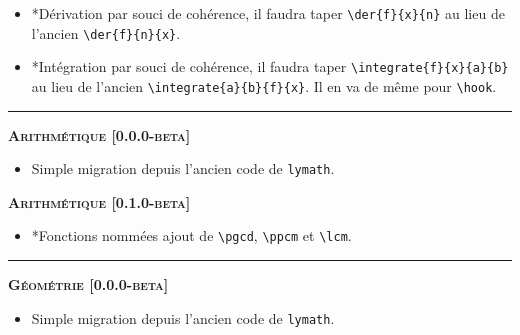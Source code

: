 \documentclass[12pt,a4paper]{book}
\makeatletter
\newcommand\env[1]{\texttt{#1}}
\newcommand\macro[1]{\env{\textbackslash{}#1}}
\theoremstyle{definition}
\newcommand\separation{
	\medskip
	\hfill\rule{0.5\textwidth}{0.75pt}\hfill
	\medskip
}
\newcommand\topic{\@ifstar{\@topic@star}{\@topic@no@star}}
\newcommand\@topic@no@star[1]{%
	\textbf{\textsc{#1}.}%
}
\newcommand\@topic@star[1]{%
	\textbf{\textsc{#1} :}%
}
\makeatother
\begin{document}
{{\begin{description}
\begin{itemize}[itemsep=.5em]
        
    
        \item \topic*{Dérivation}
              par souci de cohérence, il faudra taper \verb#\der{f}{x}{n}# au lieu de l'ancien \verb#\der{f}{n}{x}#.
    
    
        
    
        \item \topic*{Intégration}
              par souci de cohérence, il faudra taper \verb#\integrate{f}{x}{a}{b}# au lieu de l'ancien \verb#\integrate{a}{b}{f}{x}#.
              Il en va de même pour \macro{hook}.
    
    
        
    \end{itemize}
    
    
    \separation
    
    
    
    
    \begin{center}
        \textbf{\textsc{Arithmétique [0.0.0-beta]}}
    \end{center}
    
    \begin{itemize}[itemsep=.5em]
        \item Simple migration depuis l'ancien code de \verb+lymath+.
    \end{itemize}
    
    
    \begin{center}
        \textbf{\textsc{Arithmétique [0.1.0-beta]}}
    \end{center}
    
    \begin{itemize}[itemsep=.5em]
        \item \topic*{Fonctions nommées} ajout de \macro{pgcd}, \macro{ppcm} et \macro{lcm}.
    \end{itemize}
    
    
    \separation
    
    
    
    
    \begin{center}
        \textbf{\textsc{Géométrie [0.0.0-beta]}}
    \end{center}
    
    \begin{itemize}[itemsep=.5em]
        \item Simple migration depuis l'ancien code de \verb+lymath+.
    \end{itemize}
    

\end{description}}}
\end{document}
